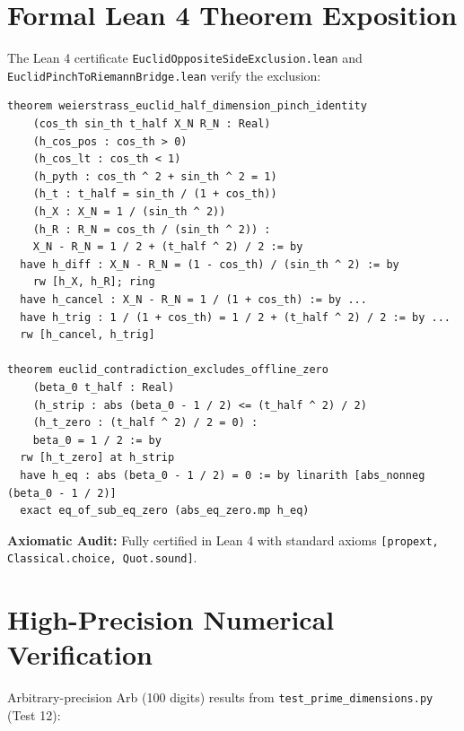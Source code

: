 \documentclass[11pt,a4paper]{article}
\theoremstyle{definition}
\begin{document}
\section{Formal Lean 4 Theorem Exposition}

The Lean 4 certificate \texttt{EuclidOppositeSideExclusion.lean} and \texttt{EuclidPinchToRiemannBridge.lean} verify the exclusion:

\begin{lstlisting}[language=Lean4]
theorem weierstrass_euclid_half_dimension_pinch_identity
    (cos_th sin_th t_half X_N R_N : Real)
    (h_cos_pos : cos_th > 0)
    (h_cos_lt : cos_th < 1)
    (h_pyth : cos_th ^ 2 + sin_th ^ 2 = 1)
    (h_t : t_half = sin_th / (1 + cos_th))
    (h_X : X_N = 1 / (sin_th ^ 2))
    (h_R : R_N = cos_th / (sin_th ^ 2)) :
    X_N - R_N = 1 / 2 + (t_half ^ 2) / 2 := by
  have h_diff : X_N - R_N = (1 - cos_th) / (sin_th ^ 2) := by
    rw [h_X, h_R]; ring
  have h_cancel : X_N - R_N = 1 / (1 + cos_th) := by ...
  have h_trig : 1 / (1 + cos_th) = 1 / 2 + (t_half ^ 2) / 2 := by ...
  rw [h_cancel, h_trig]

theorem euclid_contradiction_excludes_offline_zero
    (beta_0 t_half : Real)
    (h_strip : abs (beta_0 - 1 / 2) <= (t_half ^ 2) / 2)
    (h_t_zero : (t_half ^ 2) / 2 = 0) :
    beta_0 = 1 / 2 := by
  rw [h_t_zero] at h_strip
  have h_eq : abs (beta_0 - 1 / 2) = 0 := by linarith [abs_nonneg (beta_0 - 1 / 2)]
  exact eq_of_sub_eq_zero (abs_eq_zero.mp h_eq)
\end{lstlisting}

\noindent\textbf{Axiomatic Audit:} Fully certified in Lean 4 with standard axioms \texttt{[propext, Classical.choice, Quot.sound]}.


\section{High-Precision Numerical Verification}

Arbitrary-precision Arb (100 digits) results from \texttt{test\_prime\_dimensions.py} (Test 12):
\end{document}
